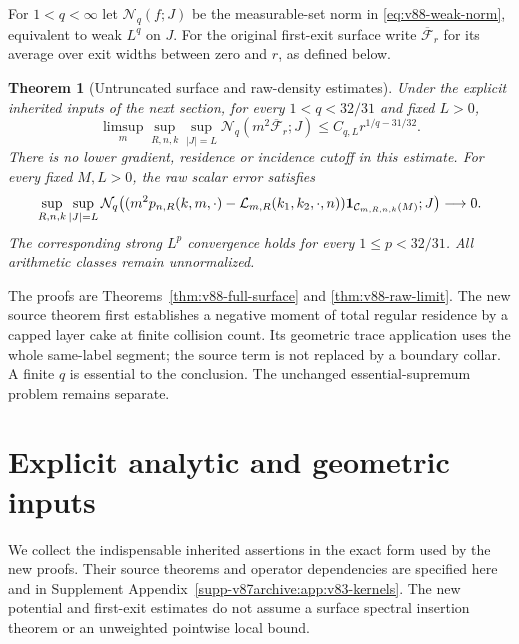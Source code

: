 \documentclass[11pt,reqno]{amsart}
\numberwithin{equation}{section}
\newtheorem{theorem}{Theorem}[section]
\theoremstyle{definition}\newtheorem{definition}[theorem]{Definition}
\theoremstyle{remark}\newtheorem{remark}[theorem]{Remark}
\theoremstyle{definition}\newtheorem{inputstatement}[theorem]{Input statement}
\begin{document}
For $1<q<\infty$ let $\mathcal N_q(f;J)$ be the measurable-set norm
in \eqref{eq:v88-weak-norm}, equivalent to weak $L^q$ on $J$.
For the original first-exit surface write $\overline{\mathcal F}_r$
for its average over exit widths between zero and $r$, as defined below.
\begin{theorem}[Untruncated surface and raw-density estimates]
\label{thm:v88-main}
Under the explicit inherited inputs of the next section, for every
$1<q<32/31$ and fixed $L>0$,
\[
 \limsup_m\sup_{R,n,k}\sup_{|J|=L}
 \mathcal N_q(m^2\overline{\mathcal F}_r;J)
                      \le C_{q,L}r^{1/q-31/32}.
\]
There is no lower gradient, residence or incidence cutoff in this
estimate. For every fixed $M,L>0$, the raw scalar error satisfies
\[
 \sup_{R,n,k}\sup_{|J|=L}
 \mathcal N_q\!\left(
 (m^2p_{n,R}(k,m,\cdot)-\mathcal L_{m,R}(k_1,k_2,\cdot,n))
 \mathbf1_{\mathcal C_{m,R,n,k}(M)};J\right)\longrightarrow0.
\]
The corresponding strong $L^p$ convergence holds for every
$1\le p<32/31$. All arithmetic classes remain unnormalized.
\end{theorem}
The proofs are Theorems~\ref{thm:v88-full-surface} and
\ref{thm:v88-raw-limit}. The new source theorem first establishes a
negative moment of total regular residence by a capped layer cake at
finite collision count. Its geometric trace application uses the
whole same-label segment; the source term is not replaced by a
boundary collar. A finite $q$ is essential to the conclusion. The
unchanged essential-supremum problem remains separate.

\section{Explicit analytic and geometric inputs}
We collect the indispensable inherited assertions in the exact form
used by the new proofs. Their source theorems and operator dependencies
are specified here and in Supplement Appendix~\ref{supp-v87archive:app:v83-kernels}. The new
potential and first-exit estimates do not assume a surface spectral
insertion theorem or an unweighted pointwise local bound.
\end{document}
